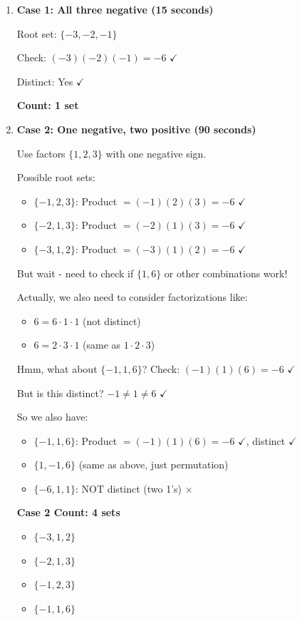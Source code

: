 \documentclass[12pt]{article}
\begin{document}
\begin{solutionbox}
\begin{enumerate}[leftmargin=*]
    \item \textbf{Case 1: All three negative (15 seconds)}
    
    Root set: $\{-3, -2, -1\}$
    
    Check: $(-3)(-2)(-1) = -6$ $\checkmark$
    
    Distinct: Yes $\checkmark$
    
    \textbf{Count: 1 set}
    
    \item \textbf{Case 2: One negative, two positive (90 seconds)}
    
    Use factors $\{1, 2, 3\}$ with one negative sign.
    
    Possible root sets:
    \begin{itemize}
        \item $\{-1, 2, 3\}$: Product $= (-1)(2)(3) = -6$ $\checkmark$
        \item $\{-2, 1, 3\}$: Product $= (-2)(1)(3) = -6$ $\checkmark$
        \item $\{-3, 1, 2\}$: Product $= (-3)(1)(2) = -6$ $\checkmark$
    \end{itemize}
    
    But wait - need to check if $\{1, 6\}$ or other combinations work!
    
    Actually, we also need to consider factorizations like:
    \begin{itemize}
        \item $6 = 6 \cdot 1 \cdot 1$ (not distinct)
        \item $6 = 2 \cdot 3 \cdot 1$ (same as $1 \cdot 2 \cdot 3$)
    \end{itemize}
    
    Hmm, what about $\{-1, 1, 6\}$? Check: $(-1)(1)(6) = -6$ $\checkmark$
    
    But is this distinct? $-1 \neq 1 \neq 6$ $\checkmark$
    
    So we also have:
    \begin{itemize}
        \item $\{-1, 1, 6\}$: Product $= (-1)(1)(6) = -6$ $\checkmark$, distinct $\checkmark$
        \item $\{1, -1, 6\}$ (same as above, just permutation)
        \item $\{-6, 1, 1\}$: NOT distinct (two 1's) $\times$
    \end{itemize}
    
    \textbf{Case 2 Count: 4 sets}
    \begin{itemize}
        \item $\{-3, 1, 2\}$
        \item $\{-2, 1, 3\}$
        \item $\{-1, 2, 3\}$
        \item $\{-1, 1, 6\}$
    \end{itemize}
    

\end{enumerate}
\end{solutionbox}
\end{document}
